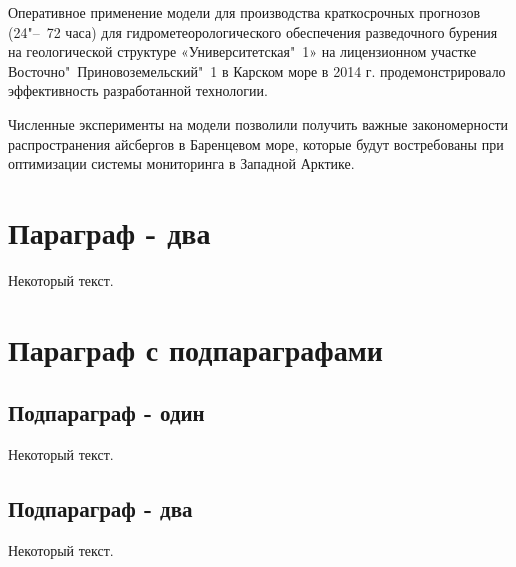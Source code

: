 Оперативное применение модели для производства краткосрочных прогнозов (24"--~72 часа) для гидрометеорологического обеспечения разведочного бурения на геологической структуре «Университетская"~1» на лицензионном участке Восточно"~Приновоземельский"~1 в Карском море в 2014 г. продемонстрировало эффективность разработанной технологии. 

Численные эксперименты на модели позволили получить важные закономерности распространения айсбергов в Баренцевом море, которые будут востребованы при оптимизации системы мониторинга в Западной Арктике.



\section{Параграф - два} \label{sect4_2}

Некоторый текст.


\section{Параграф с подпараграфами} \label{sect4_3}

\subsection{Подпараграф - один} \label{subsect4_4_1}

Некоторый текст.

\subsection{Подпараграф - два} \label{subsect4_4_2}

Некоторый текст.

\clearpage